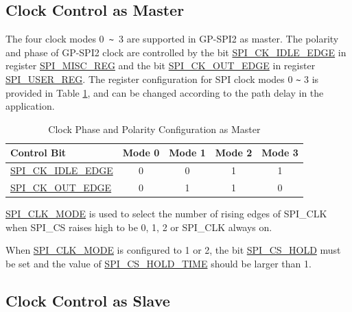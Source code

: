 \documentclass[main\_\_EN.tex]{subfiles}
\begin{document}
\subsection{Clock Control as Master}\label{GP-SPI2 master clock control}

The four clock modes 0\verb+ ~ +3 are supported in GP-SPI2 as master. The polarity and phase of GP-SPI2 clock are controlled by the bit \hyperref[fielddesc:SPICKIDLEEDGE]{SPI\_CK\_IDLE\_EDGE} in register \hyperref[regdesc:SPIMISCREG]{SPI\_MISC\_REG} and the bit \hyperref[fielddesc:SPICKOUTEDGE]{SPI\_CK\_OUT\_EDGE} in register \hyperref[regdesc:SPIUSERREG]{SPI\_USER\_REG}. The register configuration for SPI clock modes 0 \verb+~+ 3 is provided in Table \ref{table:clock_pol_master}, and can be changed according to the path delay in the application.

\begin{table}[H]
    \centering
    \caption{Clock Phase and Polarity Configuration as Master}
    \label{table:clock_pol_master}
    \begin{tabular}[c]{|p{3.5cm}|c|c|c|c|}
    \hline
    \rowcolor{lightgray}
    \textbf{Control Bit} & \textbf{Mode 0} & \textbf{Mode 1} & \textbf{Mode 2} & \textbf{Mode 3}\\
    \hline
    \hyperref[fielddesc:SPICKIDLEEDGE]{SPI\_CK\_IDLE\_EDGE}  & 0     & 0     & 1     & 1\\
    \hline
    \hyperref[fielddesc:SPICKOUTEDGE]{SPI\_CK\_OUT\_EDGE}   & 0     & 1     & 1     & 0\\
    \hline
    \end{tabular}
\end{table}

\hyperref[fielddesc:SPICLKMODE]{SPI\_CLK\_MODE} is used to select the number of rising edges of SPI\_CLK when SPI\_CS raises high to be 0, 1, 2 or SPI\_CLK always on. 

\begin{tiplisting}
When \hyperref[fielddesc:SPICLKMODE]{SPI\_CLK\_MODE} is configured to 1 or 2, the bit \hyperref[fielddesc:SPICSHOLD]{SPI\_CS\_HOLD} must be set and the value of \hyperref[fielddesc:SPICSHOLDTIME]{SPI\_CS\_HOLD\_TIME} should be larger than 1.
\end{tiplisting}
\vspace{-1em}

\subsection{Clock Control as Slave}\label{GP-SPI2 slave clock control}
\end{document}
